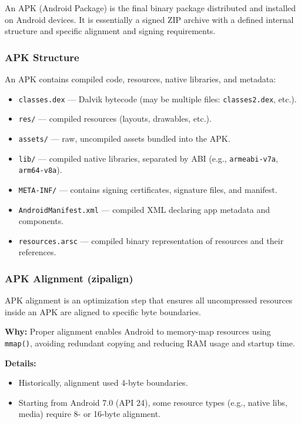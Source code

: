 \documentclass[a4paper,12pt]{article}
\begin{document}
An APK (Android Package) is the final binary package distributed and installed on Android devices. It is essentially a signed ZIP archive with a defined internal structure and specific alignment and signing requirements.

\subsubsection{APK Structure}

An APK contains compiled code, resources, native libraries, and metadata:

\begin{itemize}
  \item \texttt{classes.dex} — Dalvik bytecode (may be multiple files: \texttt{classes2.dex}, etc.).
  \item \texttt{res/} — compiled resources (layouts, drawables, etc.).
  \item \texttt{assets/} — raw, uncompiled assets bundled into the APK.
  \item \texttt{lib/} — compiled native libraries, separated by ABI (e.g., \texttt{armeabi-v7a}, \texttt{arm64-v8a}).
  \item \texttt{META-INF/} — contains signing certificates, signature files, and manifest.
  \item \texttt{AndroidManifest.xml} — compiled XML declaring app metadata and components.
  \item \texttt{resources.arsc} — compiled binary representation of resources and their references.
\end{itemize}

\subsubsection{APK Alignment (zipalign)}

APK alignment is an optimization step that ensures all uncompressed resources inside an APK are aligned to specific byte boundaries.

\textbf{Why:} Proper alignment enables Android to memory-map resources using \texttt{mmap()}, avoiding redundant copying and reducing RAM usage and startup time.

\textbf{Details:}
\begin{itemize}
  \item Historically, alignment used 4-byte boundaries.
  \item Starting from Android 7.0 (API 24), some resource types (e.g., native libs, media) require 8- or 16-byte alignment.
\end{itemize}
\end{document}
